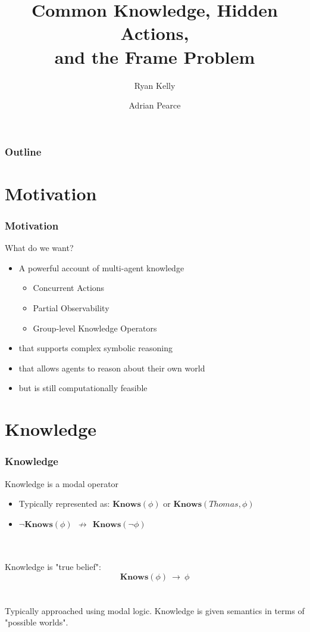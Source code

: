 \documentclass{beamer}
\title{Common Knowledge, Hidden Actions,\\ and the Frame Problem}
\author[Ryan Kelly (rfk@csse.unimelb.edu.au)]{Ryan Kelly \and Adrian Pearce}
\begin{document}
\begin{frame}
  \titlepage
\end{frame}

\begin{frame}
  \frametitle{Outline}
  \tableofcontents
\end{frame}

\section{Motivation}

\begin{frame}
\frametitle{Motivation}
What do we want?
\begin{itemize}
\item A powerful account of multi-agent knowledge
  \begin{itemize}
  \item Concurrent Actions
  \item Partial Observability
  \item Group-level Knowledge Operators
  \end{itemize}
\item that supports complex symbolic reasoning
\item that allows agents to reason about their own world
\item but is still computationally feasible
\end{itemize}
\end{frame}


\section{Knowledge}

\begin{frame}
\frametitle{Knowledge}

Knowledge is a modal operator
\begin{itemize}
\item Typically represented as: $\mathbf{Knows}(\phi)$ or $\mathbf{Knows}(Thomas,\phi)$
\item $\neg\mathbf{Knows}(\phi)\ \ \not\rightarrow\ \ \mathbf{Knows}(\neg\phi)$
\end{itemize}
\ \\
\ \\
Knowledge is "true belief":
\[ \mathbf{Knows}(\phi)\ \rightarrow\ \phi \]
\ \\
\ \\
Typically approached using modal logic.
Knowledge is given semantics in terms of "possible worlds".

\end{frame}
\end{document}
